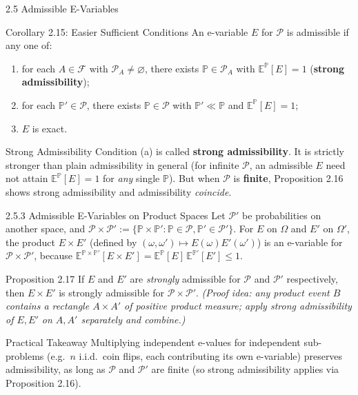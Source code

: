 \documentclass[aspectratio=169,10pt]{beamer}
\newcommand{\PP}{\mathbb{P}}
\newcommand{\EE}{\mathbb{E}}
\newcommand{\calP}{\mathcal{P}}
\newcommand{\calF}{\mathcal{F}}
\begin{document}
\begin{frame}[allowframebreaks]{2.5 Admissible E-Variables}
  \begin{block}{Corollary 2.15: Easier Sufficient Conditions}
    An e-variable $E$ for $\calP$ is admissible if any one of:
    \begin{enumerate}
      \item[(a)] for each $A\in\calF$ with $\calP_A\ne\varnothing$, there
        exists $\PP\in\calP_A$ with $\EE^\PP[E]=1$ (\textbf{strong
        admissibility});
      \item[(b)] for each $\PP'\in\calP$, there exists $\PP\in\calP$ with
        $\PP'\ll\PP$ and $\EE^\PP[E]=1$;
      \item[(c)] $E$ is exact.
    \end{enumerate}
  \end{block}

  \begin{alertblock}{Strong Admissibility}
    Condition (a) is called \textbf{strong admissibility}. It is strictly
    stronger than plain admissibility in general (for infinite $\calP$, an
    admissible $E$ need not attain $\EE^\PP[E]=1$ for \emph{any} single
    $\PP$). But when $\calP$ is \textbf{finite}, Proposition 2.16 shows
    strong admissibility and admissibility \emph{coincide}.
  \end{alertblock}

  \framebreak

  \begin{block}{2.5.3 Admissible E-Variables on Product Spaces}
    Let $\calP'$ be probabilities on another space, and
    $\calP\times\calP' := \{\PP\times\PP' : \PP\in\calP,\PP'\in\calP'\}$.
    For $E$ on $\Omega$ and $E'$ on $\Omega'$, the product
    $E\times E'$ (defined by $(\omega,\omega')\mapsto E(\omega)E'(\omega')$)
    is an e-variable for $\calP\times\calP'$, because
    $\EE^{\PP\times\PP'}[E\times E'] = \EE^\PP[E]\,\EE^{\PP'}[E'] \le 1$.
  \end{block}

  \begin{block}{Proposition 2.17}
    If $E$ and $E'$ are \emph{strongly} admissible for $\calP$ and $\calP'$
    respectively, then $E\times E'$ is strongly admissible for
    $\calP\times\calP'$. \emph{(Proof idea: any product event $B$ contains
    a rectangle $A\times A'$ of positive product measure; apply strong
    admissibility of $E, E'$ on $A, A'$ separately and combine.)}
  \end{block}

  \begin{alertblock}{Practical Takeaway}
    Multiplying independent e-values for independent sub-problems (e.g.\
    $n$ i.i.d.\ coin flips, each contributing its own e-variable) preserves
    admissibility, as long as $\calP$ and $\calP'$ are finite (so strong
    admissibility applies via Proposition 2.16).
  \end{alertblock}

\end{frame}
\end{document}
